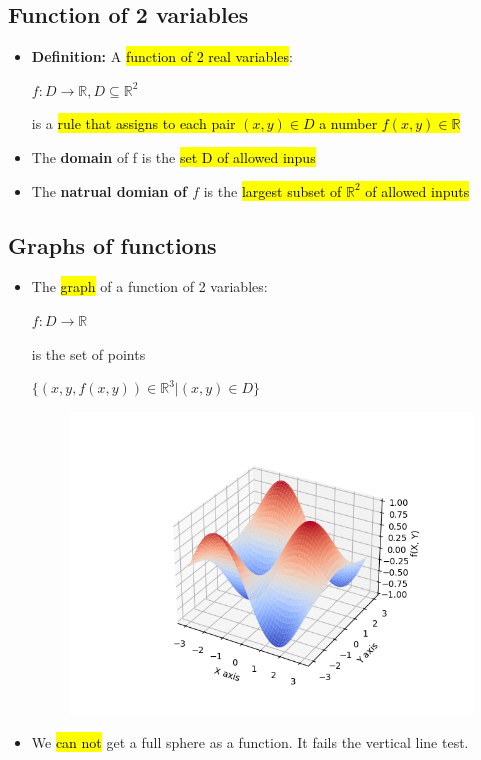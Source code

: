 \documentclass{article}
\begin{document}
  \subsection*{Function of 2 variables}
  \begin{itemize}
  	\item \textbf{Definition:} A \hl{function of 2 real variables}:
  	\begin{center}
  		$f: D \rightarrow \mathbb{R}, D \subseteq \mathbb{R}^2$
  	\end{center}
  	is a \hl{rule that assigns to each pair $(x,y) \in D$ a number $f(x,y) \in \mathbb{R}$}

  	\item The \textbf{domain} of f is the \hl{set D of allowed inpus}

  	\item The \textbf{natrual domian of $f$} is the \hl{largest subset of $\mathbb{R}^2$ of allowed inputs}
  \end{itemize}

  \subsection*{Graphs of functions}
  \begin{itemize}
  	\item The \hl{graph} of a function of 2 variables:
  		\begin{center}
  			$f: D \rightarrow \mathbb{R}$
  		\end{center}
  		is the set of points
  		\begin{center}
  			$\{(x,y,f(x,y))\in \mathbb{R}^3 | (x,y) \in D\}$
  		\end{center}
		\includegraphics[width=1.0\textwidth, height=8cm]{Graphs/w8_1.png}

	\item We \hl{can not} get a full sphere as a function. It fails the vertical line test.
  \end{itemize}
\end{document}
